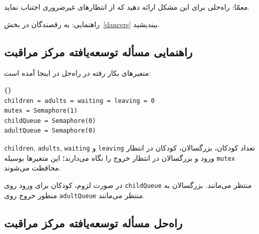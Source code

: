 \documentclass{book}
\newcommand{\clearemptydoublepage}{\newpage\cleardoublepage}
\begin{document}
    معمّا: راه‌حلی برای این مشکل ارائه دهید که از انتظارهای غیرضروری اجتناب نماید. 

    راهنمایی: به رقصندگان در بخش~\ref{dancers} بیندیشید. 



\clearemptydoublepage
\subsection {راهنمایی مسأله توسعه‌یافته مرکز مراقبت}

    متغیرهای بکار رفته در راه‌حل در اینجا آمده است:

\begin{latin}
\begin{lstlisting}[title=\rl{راهنمایی مسأله توسعه‌یافته مرکز مراقبت}]{}
children = adults = waiting = leaving = 0
mutex = Semaphore(1)
childQueue = Semaphore(0)
adultQueue = Semaphore(0)
\end{lstlisting}
\end{latin}

{\tt children}, {\tt adults}, {\tt waiting} و {\tt leaving}
    تعداد کودکان، بزرگسالان، کودکان در انتظار ورود و بزرگسالان در انتظار خروج را نگاه می‌دارند؛ این متغیرها بوسیله {\tt mutex} محافظت می‌شوند. 

    در صورت لزوم،  کودکان  برای ورود  روی {\tt childQueue}  منتظر می‌مانند. 
    بزرگسالان به منظور خروج روی  {\tt adultQueue}  منتظر می‌مانند. 

\clearemptydoublepage
\subsection {راه‌حل مسأله توسعه‌یافته مرکز مراقبت}
\end{document}
